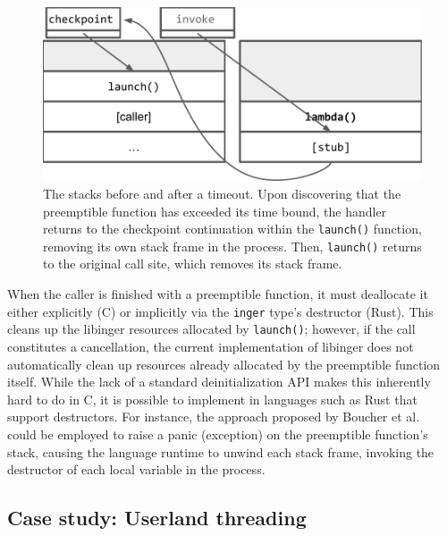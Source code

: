 \begin{figure}
\includegraphics[width=\columnwidth]{figs/twostacks}
\caption{The stacks before and after a timeout.  \textnormal{Upon discovering
that the preemptible function has exceeded its time bound, the handler returns to the
checkpoint continuation within the \texttt{launch()} function, removing its own stack
frame in the process.  Then, \texttt{launch()} returns to the original call site,
which removes its stack frame.}}
\label{fig:twostacks}
\end{figure}

When the caller is finished with a preemptible function, it must deallocate it either
explicitly (C) or implicitly via the \texttt{inger} type's destructor (Rust).  This
cleans up the libinger resources allocated by \texttt{launch()}; however, if the call
constitutes a cancellation, the current implementation of libinger does not
automatically clean up resources already allocated by the preemptible function
itself.  While the lack of a standard deinitialization API makes this inherently hard
to do in C, it is possible to implement in languages such as Rust that support
destructors.  For instance, the approach proposed by Boucher et
al.~\cite{boucher:atc2018} could be employed to raise a panic (exception) on the
preemptible function's stack, causing the language runtime to unwind each stack frame,
invoking the destructor of each local variable in the process.

\subsection{Case study: Userland threading}
\label{sec:threading}
